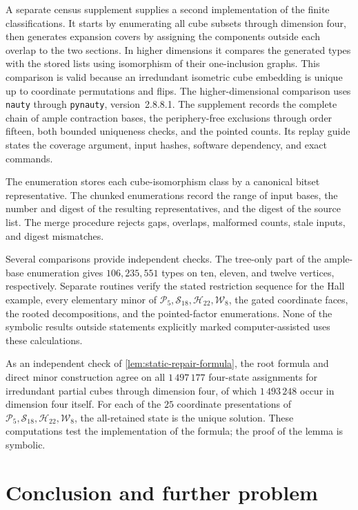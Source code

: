\documentclass[11pt]{article}
\theoremstyle{definition}
\theoremstyle{remark}
\begin{document}
A separate census supplement supplies a second implementation of the
finite classifications. It starts by enumerating all cube subsets through
dimension four, then generates expansion covers by assigning the components
outside each overlap to the two sections. In higher dimensions it compares
the generated types with the stored lists using isomorphism of their
one-inclusion graphs. This comparison is valid because an irredundant
isometric cube embedding is unique up to coordinate permutations and flips.
The higher-dimensional comparison uses \texttt{nauty}
\cite{McKayPiperno14} through \texttt{pynauty}, version~2.8.8.1.
The supplement records the complete chain of ample contraction bases,
the periphery-free exclusions through order fifteen, both bounded
uniqueness checks, and the pointed counts. Its replay guide states the
coverage argument, input hashes, software dependency, and exact commands.

The enumeration stores each cube-isomorphism class
by a canonical bitset representative.  The chunked enumerations record the
range of input bases, the number and digest of the resulting representatives,
and the digest of the source list.  The merge procedure rejects gaps,
overlaps, malformed counts, stale inputs, and digest mismatches.

Several comparisons provide independent checks. The tree-only part of the
ample-base enumeration gives \(106,235,551\) types on ten, eleven, and
twelve vertices, respectively.  Separate routines verify the stated
restriction sequence for the Hall example, every elementary minor of
\(\mathcal P_5,\mathcal S_{18},\mathcal H_{22},\mathcal W_8\), the gated
coordinate faces,
the rooted decompositions, and the pointed-factor enumerations.  None of the
symbolic results outside statements explicitly marked computer-assisted uses
these calculations.

As an independent check of \cref{lem:static-repair-formula}, the root
formula and direct minor construction agree on all \(1\,497\,177\)
four-state assignments for irredundant partial cubes through dimension
four, of which \(1\,493\,248\) occur in dimension four itself. For each of
the \(25\) coordinate presentations of
\(\mathcal P_5,\mathcal S_{18},\mathcal H_{22},\mathcal W_8\), the
all-retained state is the unique solution.  These computations test the
implementation of the formula; the proof of the lemma is symbolic.

\section{Conclusion and further problem}
\label{sec:conclusion}
\end{document}
